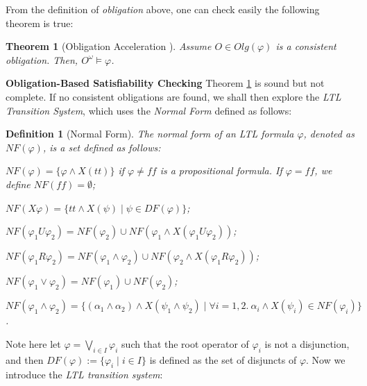 \documentclass[conference]{IEEEtran}
\newtheorem{definition}{Definition}
\newtheorem{theorem}{Theorem}
\def\olg#1{\mathit{Olg}(#1)}
\def\phi{\varphi}
\def\ff{\mathit{ff}}
\def\tt{\mathit{tt}}
\def\expand{\mathit{NF}}
\begin{document}
From the definition of \textit{obligation} above, one can check easily the following theorem 
is true:
\begin{theorem}[Obligation Acceleration \cite{LZPVH13}]\label{thm:oa}
  Assume $O\in \olg{\phi}$ is a consistent obligation. Then,
  $O^\omega\models \phi$.
\end{theorem}

\noindent
\textbf{Obligation-Based Satisfiability Checking}
Theorem \ref{thm:oa} is sound but not complete. If no consistent
obligations are found, we shall then explore the \textit{LTL
  Transition System}, which uses the \textit{Normal Form} defined as
follows:

\begin{definition}[Normal Form]\label{def:expansion}
  The \textit{normal form} of an LTL formula $\phi$, denoted as
  $\expand(\phi)$, is a set defined as follows:
\begin{compactenum}
\item $\expand(\phi) =\{\phi \wedge X(\tt)\}$ if $\phi\not=\ff$ is a
  propositional formula. If $\phi =\ff$, we define $\expand(\ff)=\emptyset$;
\item $\expand(X\phi) = \{\tt\wedge X(\psi)\mid \psi\in DF(\phi)\}$;
\item $\expand(\phi_1 U \phi_2) = \expand(\phi_2)\cup \expand( \phi_1 \wedge
  X(\phi_1 U \phi_2))$;
\item $\expand(\phi_1 R \phi_2) = \expand(\phi_1 \wedge \phi_2) \cup \expand( \phi_2 \wedge X(\phi_1 R \phi_2))$;
\item $\expand(\phi_1 \vee \phi_2) = \expand(\phi_1)\cup \expand(\phi_2)$;
\item $\expand(\phi_1\wedge\phi_2) = \{(\alpha_1\wedge\alpha_2) \wedge X(\psi_1\wedge\psi_2)\mid \forall i=\mathit{1,2}. \ \alpha_i\wedge X(\psi_i)\in \expand(\phi_i)\}$.
\end{compactenum}
\end{definition}

Note here let $\phi = \bigvee_{i\in I} \phi_i$ such that the root
operator of $\phi_i$ is not a disjunction, and then $DF(\phi):=\{\phi_i \mid i\in I\}$ 
is defined as the set of
disjuncts of $\phi$. Now we introduce the \textit{LTL transition system}:
\end{document}
